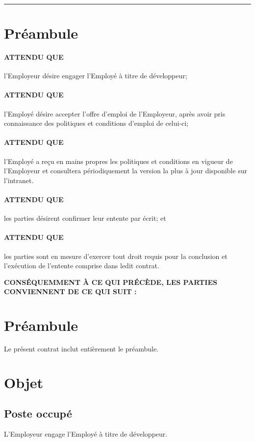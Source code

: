 \documentclass{article}
\begin{document}
    \hrule
    
    \section*{Préambule}
    
    \paragraph{ATTENDU QUE} l'Employeur désire engager l'Employé à titre de développeur;
    \paragraph{ATTENDU QUE} l'Employé désire accepter l'offre d'emploi de l'Employeur, après avoir pris connaissance des politiques et conditions d'emploi de celui-ci;
    \paragraph{ATTENDU QUE} l'Employé a reçu en mains propres les politiques et conditions en vigueur de l'Employeur et consultera périodiquement la version la plus à jour disponible sur l'intranet.
    \paragraph{ATTENDU QUE} les parties désirent confirmer leur entente par écrit; et
    \paragraph{ATTENDU QUE} les parties sont en mesure d'exercer tout droit requis pour la conclusion et l'exécution de l'entente comprise dans ledit contrat.
    
    \pagebreak
    
    {\bfseries\footnotesize\uppercase{Conséquemment à ce qui précède, les parties conviennent de ce qui suit :}}
    
    \section{Préambule}
    Le présent contrat inclut entièrement le préambule.
    
    \section{Objet}
    	\subsection{Poste occupé}
    	L'Employeur engage l'Employé à titre de développeur.
\end{document}
